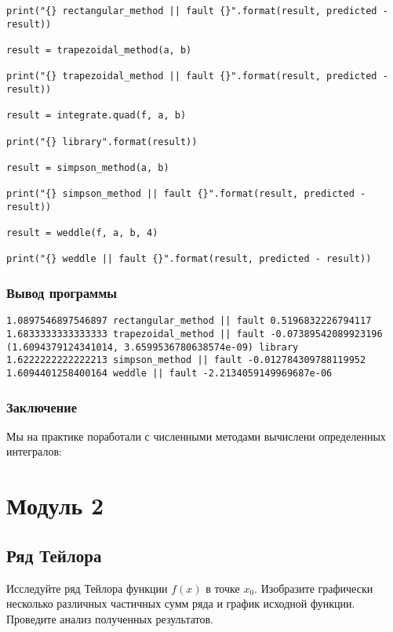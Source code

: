 \documentclass{article}
\newenvironment{codelisting}{\captionsetup{type=listing}}{}
\begin{document}
\begin{codelisting}
\begin{verbatim}
print("{} rectangular_method || fault {}".format(result, predicted - result))

result = trapezoidal_method(a, b)

print("{} trapezoidal_method || fault {}".format(result, predicted - result))

result = integrate.quad(f, a, b)

print("{} library".format(result))

result = simpson_method(a, b)

print("{} simpson_method || fault {}".format(result, predicted - result))

result = weddle(f, a, b, 4)

print("{} weddle || fault {}".format(result, predicted - result))
\end{verbatim}
\end{codelisting}

\subsubsection*{Вывод программы}

\begin{verbatim}
1.0897546897546897 rectangular_method || fault 0.5196832226794117
1.6833333333333333 trapezoidal_method || fault -0.07389542089923196
(1.6094379124341014, 3.6599536780638574e-09) library
1.6222222222222213 simpson_method || fault -0.012784309788119952
1.6094401258400164 weddle || fault -2.2134059149969687e-06
\end{verbatim}

\subsubsection*{Заключение}

Мы на практике поработали с численными методами вычислени определенных интегралов:

\section{Модуль 2}

\subsection{Ряд Тейлора}
Исследуйте ряд Тейлора функции $f(x)$ в точке $x_0$. Изобразите графически несколько различных  частичных сумм ряда и график исходной функции. Проведите анализ полученных результатов.\\
\end{document}
